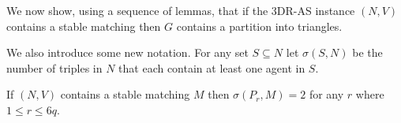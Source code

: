 
We now show, using a sequence of lemmas, that if the 3DR-AS instance $(N, V)$ contains a stable matching then $G$ contains a partition into triangles. 

We also introduce some new notation. For any set $S \subseteq N$ let $\sigma(S, N)$ be the number of triples in $N$ that each contain at least one agent in $S$.

\begin{lem}
\label{lem:threed_sr_as_pentagadgetagentsbelongtotwoagents}
If $(N, V)$ contains a stable matching $M$ then $\sigma(P_r, M) = 2$ for any $r$ where $1 \leq r \leq 6q$.
\end{lem}
